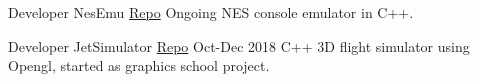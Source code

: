 \begin{cventries}
  \cventry
    {Developer} %
    {NesEmu \tiny{\href{https://github.com/mido3ds/nesemu}{Repo}}} %
    {} %
    {Ongoing} %
    {
      NES console ​emulator​ in C++.
    }

  \cventry
    {Developer} %
    {JetSimulator \tiny{\href{https://github.com/mido3ds/JetSimulator}{Repo}}} %
    {} %
    {Oct-Dec 2018} %
    {
      {C++ 3D​ ​flight simulator​ using Opengl, started as graphics school project.}
    }


\end{cventries}


